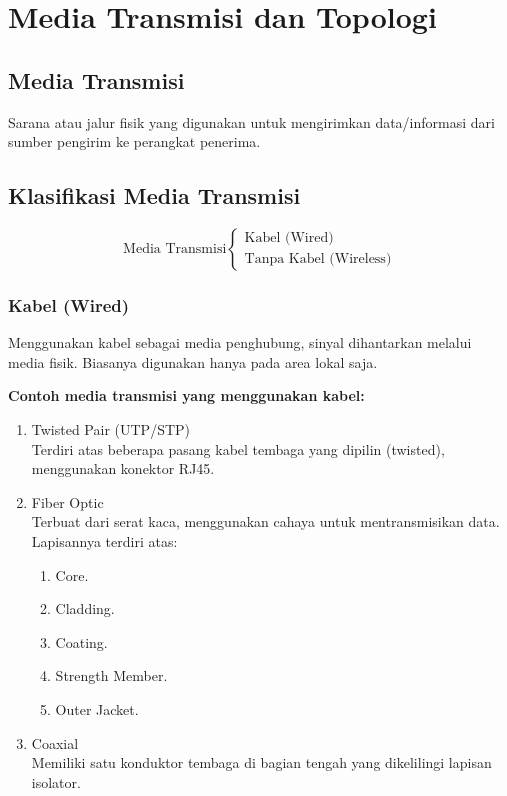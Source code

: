 \section{Media Transmisi dan Topologi}
\subsection{Media Transmisi}
Sarana atau jalur fisik yang digunakan untuk mengirimkan data/informasi dari sumber pengirim ke perangkat penerima.

\subsection{Klasifikasi Media Transmisi}
$$\text{Media Transmisi}
\begin{cases}
  \text{Kabel (Wired)} \\
  \text{Tanpa Kabel (Wireless)}
\end{cases}
$$

\subsubsection{Kabel (Wired)}
Menggunakan kabel sebagai media penghubung, sinyal dihantarkan melalui media fisik. Biasanya digunakan hanya pada area lokal saja.


\textbf{Contoh media transmisi yang menggunakan kabel:}
\begin{enumerate}
\item Twisted Pair (UTP/STP) \\
  Terdiri atas beberapa pasang kabel tembaga yang dipilin (twisted), menggunakan konektor RJ45.
\item Fiber Optic \\
  Terbuat dari serat kaca, menggunakan cahaya untuk mentransmisikan data. Lapisannya terdiri atas:
  \begin{enumerate}
  \item Core.
  \item Cladding.
  \item Coating.
  \item Strength Member.
  \item Outer Jacket.
  \end{enumerate}
\item Coaxial \\
  Memiliki satu konduktor tembaga di bagian tengah yang dikelilingi lapisan isolator.
\end{enumerate}

